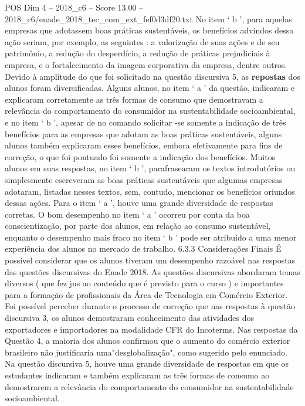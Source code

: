 \begin{textsample}{POS Dim 4 – 2018\_c6 – Score 13.00 – 2018\_c6/enade\_2018\_tec\_com\_ext\_fef0d3df20.txt}
No item ‘ b ’, para aquelas empresas que adotassem boas práticas sustentáveis, os benefícios advindos dessa ação seriam, por exemplo, as seguintes : a valorização de suas ações e de seu patrimônio, a redução do desperdício, a redução de práticas prejudiciais à empresa, e o fortalecimento da imagem corporativa da empresa, dentre outros.
Devido à amplitude do que foi solicitado na questão discursiva 5, as \textbf{repostas} dos alunos foram diversificadas.
Alguns alunos, no item ‘ a ’ da questão, indicaram e explicaram corretamente as três formas de consumo que demostravam a relevância do comportamento do consumidor na sustentabilidade socioambiental, e no item ‘ b ’, apesar de no comando solicitar -se somente a indicação de três benefícios para as empresas que adotam as boas práticas sustentáveis, alguns alunos também explicaram esses benefícios, embora efetivamente para fins de correção, o que foi pontuado foi somente a indicação dos benefícios.
Muitos alunos em suas respostas, no item ‘ b ’, parafrasearam os textos introdutórios ou simplesmente escreveram as boas práticas sustentáveis que algumas empresas adotaram, listadas nesses textos, sem, contudo, mencionar os benefícios oriundos dessas ações.
Para o item ‘ a ’, houve uma grande diversidade de respostas corretas.
O bom desempenho no item ‘ a ’ ocorreu por conta da boa conscientização, por parte dos alunos, em relação ao consumo sustentável, enquanto o desempenho mais fraco no item ‘ b ’ pode ser atribuído a uma menor experiência dos alunos no mercado de trabalho. 6.3.3 Considerações Finais É possível considerar que os alunos tiveram um desempenho razoável nas respostas das questões discursivas do Enade 2018.
As questões discursivas abordaram temas diversos ( que fez jus ao conteúdo que é previsto para o curso ) e importantes para a formação de profissionais da Área de Tecnologia em Comércio Exterior.
Foi possível perceber durante o processo de correção que nas respostas à questão discursiva 3, os alunos demostraram conhecimento das atividades dos exportadores e importadores na modalidade CFR do Incoterms.
Nas respostas da Questão 4, a maioria dos alunos confirmou que o aumento do comércio exterior brasileiro não justificaria uma"desglobalização", como sugerido pelo enunciado.
Na questão discursiva 5, houve uma grande diversidade de respostas em que os estudantes indicaram e também explicaram as três formas de consumo ao demostrarem a relevância do comportamento do consumidor na sustentabilidade socioambiental.

\end{textsample}
